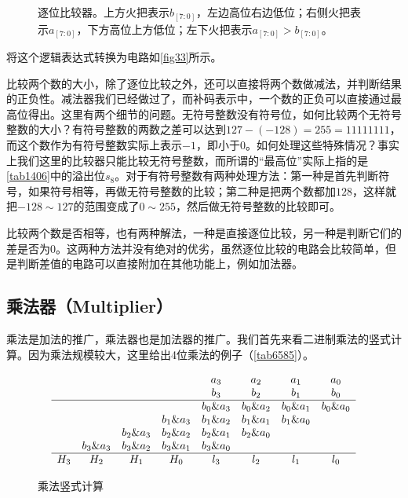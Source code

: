 \begin{figure}
  \centering
  \caption{逐位比较器。上方火把表示$b_{[7:0]}$，左边高位右边低位；右侧火把表示$a_{[7:0]}$，下方高位上方低位；左下火把表示$a_{[7:0]}\mathtt{>}b_{[7:0]}$。}\label{fig33}
\end{figure}
将这个逻辑表达式转换为电路如\autoref{fig33}所示。

比较两个数的大小，除了逐位比较之外，还可以直接将两个数做减法，并判断结果的正负性。减法器我们已经做过了，而补码表示中，一个数的正负可以直接通过最高位得出。这里有两个细节的问题。无符号整数没有符号位，如何比较两个无符号整数的大小？有符号整数的两数之差可以达到$127-(-128)=255=11111111$，而这个数作为有符号整数实际上表示$-1$，即小于0。如何处理这些特殊情况？事实上我们这里的比较器只能比较无符号整数，而所谓的“最高位”实际上指的是\autoref{tab1406}中的溢出位$s_8$。对于有符号整数有两种处理方法：第一种是首先判断符号，如果符号相等，再做无符号整数的比较；第二种是把两个数都加$128$，这样就把$-128\sim127$的范围变成了$0\sim255$，然后做无符号整数的比较即可。

比较两个数是否相等，也有两种解法，一种是直接逐位比较，另一种是判断它们的差是否为0。这两种方法并没有绝对的优劣，虽然逐位比较的电路会比较简单，但是判断差值的电路可以直接附加在其他功能上，例如加法器。

\subsection{乘法器（Multiplier）}
乘法是加法的推广，乘法器也是加法器的推广。我们首先来看二进制乘法的竖式计算。因为乘法规模较大，这里给出4位乘法的例子（\autoref{tab6585}）。

\begin{figure}[!ht]
  $$
    \begin{array}{ccccccccc}
          &          &          &          & a_3      & a_2      & a_1      & a_0      \\
          &          &          &          & b_3      & b_2      & b_1      & b_0      \\\hline
          &          &          &          & b_0\&a_3 & b_0\&a_2 & b_0\&a_1 & b_0\&a_0 \\
          &          &          & b_1\&a_3 & b_1\&a_2 & b_1\&a_1 & b_1\&a_0            \\
          &          & b_2\&a_3 & b_2\&a_2 & b_2\&a_1 & b_2\&a_0                       \\
          & b_3\&a_3 & b_3\&a_2 & b_3\&a_1 & b_3\&a_0                                  \\\hline
      H_3 & H_2      & H_1      & H_0      & l_3      & l_2      & l_1      & l_0
    \end{array}
  $$
  \caption{乘法竖式计算}\label{tab6585}
\end{figure}

